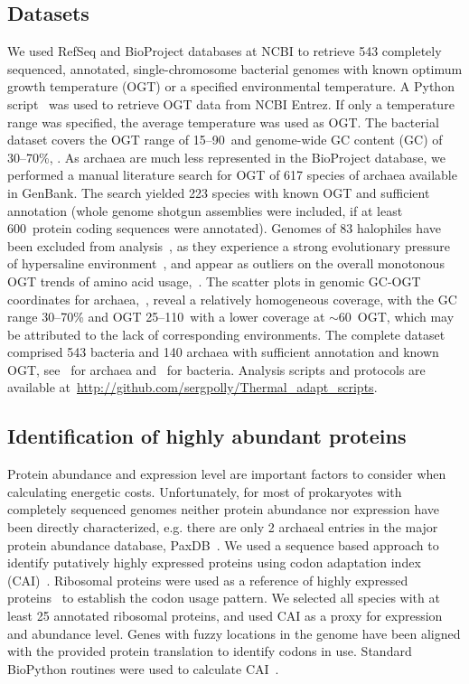 \documentclass[10pt,letterpaper]{article}
\newcommand{\PROTEINLIMIT}{600}
\begin{document}
\subsection*{Datasets}
We used RefSeq and BioProject databases at NCBI to retrieve 543 completely sequenced, annotated, single-chromosome bacterial genomes with known optimum growth temperature (OGT) or a specified environmental temperature. A Python script~\cite{Cock2009Biopython} was used to retrieve OGT data from NCBI Entrez. If only a temperature range was specified, the average temperature was used as OGT. The bacterial dataset covers the OGT range of 15--90\textcelsius\, and genome-wide GC content (GC) of 30--70\%, .
As archaea are much less represented in the BioProject database, we performed a manual literature search for OGT of 617 species of archaea available in GenBank. The search yielded 223 species with known OGT and sufficient annotation (whole genome shotgun assemblies were included, if at least \PROTEINLIMIT\ protein coding sequences were annotated). Genomes of 83 halophiles have been excluded from analysis~, as they experience a strong evolutionary pressure of hypersaline environment~\cite{Fukuchi2003Unique}, and appear as outliers on the overall monotonous OGT trends of amino acid usage,~. The scatter plots in genomic GC-OGT coordinates for archaea,~, reveal a relatively homogeneous coverage, with the GC range 30--70\% and OGT 25--110\textcelsius\ with a lower coverage at $\sim$60\textcelsius\ OGT, which may be attributed to the lack of corresponding environments. The complete dataset comprised 543 bacteria and 140 archaea with sufficient annotation and known OGT, see~ for archaea and~ for bacteria. Analysis scripts and protocols are available at~\url{http://github.com/sergpolly/Thermal_adapt_scripts}.

\subsection*{Identification of highly abundant proteins}
Protein abundance and expression level are important factors to consider when calculating energetic costs. Unfortunately, for most of prokaryotes with completely sequenced genomes neither protein abundance nor expression have been directly characterized, e.g. there are only 2 archaeal entries in the major protein abundance database, PaxDB~\cite{Wang2015Version}. We used a sequence based approach to identify putatively highly expressed proteins using codon adaptation index (CAI)~\cite{Sharp1987The}. Ribosomal proteins were used as a reference of highly expressed proteins~\cite{Pedersen1978Patterns,Srivastava1990Mechanism} to establish the codon usage pattern. We selected all species with at least 25 annotated ribosomal proteins, and used CAI as a proxy for expression and abundance level. Genes with fuzzy locations in the genome have been aligned with the provided protein translation to identify codons in use. Standard BioPython routines were used to calculate CAI~\cite{Cock2009Biopython}. 
\end{document}
